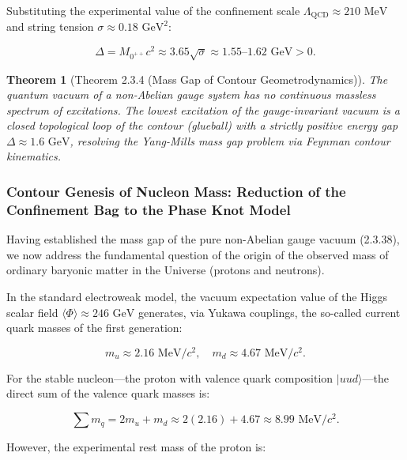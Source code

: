 \documentclass[11pt,a4paper]{article}
\newtheorem{theorem}{Theorem}[section]
\theoremstyle{definition}
\begin{document}
Substituting the experimental value of the confinement scale $\Lambda_{\text{QCD}} \approx 210\text{ MeV}$ and string tension $\sigma \approx 0.18\text{ GeV}^2$:

\begin{equation}\label{eq:2.3.38}\tag{2.3.38}
\Delta = M_{0^{++}} c^2 \approx 3.65 \sqrt{\sigma} \approx 1.55\text{--}1.62\text{ GeV} > 0.
\end{equation}

\begin{theorem}[Theorem 2.3.4 (Mass Gap of Contour Geometrodynamics)]\label{thm:2.3.4}
The quantum vacuum of a non-Abelian gauge system has no continuous massless spectrum of excitations. The lowest excitation of the gauge-invariant vacuum is a closed topological loop of the contour (glueball) with a strictly positive energy gap $\Delta \approx 1.6\text{ GeV}$, resolving the Yang-Mills mass gap problem via Feynman contour kinematics.
\end{theorem}

\subsubsection{Contour Genesis of Nucleon Mass: Reduction of the Confinement Bag to the Phase Knot Model}\label{sec:2.3.7}

Having established the mass gap of the pure non-Abelian gauge vacuum (2.3.38), we now address the fundamental question of the origin of the observed mass of ordinary baryonic matter in the Universe (protons and neutrons).

In the standard electroweak model, the vacuum expectation value of the Higgs scalar field $\langle \Phi \rangle \approx 246\text{ GeV}$ generates, via Yukawa couplings, the so-called current quark masses of the first generation:

\begin{equation}\label{eq:2.3.39}\tag{2.3.39}
m_u \approx 2.16\text{ MeV}/c^2, \quad m_d \approx 4.67\text{ MeV}/c^2.
\end{equation}

For the stable nucleon---the proton with valence quark composition $|uud\rangle$---the direct sum of the valence quark masses is:

\begin{equation}\label{eq:2.3.40}\tag{2.3.40}
\sum m_q = 2 m_u + m_d \approx 2(2.16) + 4.67 \approx 8.99\text{ MeV}/c^2.
\end{equation}

However, the experimental rest mass of the proton is:
\end{document}
